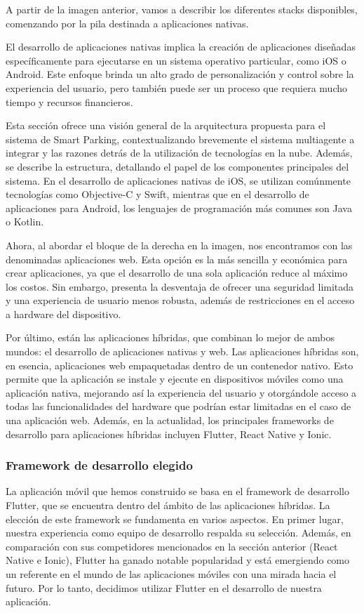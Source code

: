 A partir de la imagen anterior, vamos a describir los diferentes stacks disponibles, comenzando por la pila destinada a aplicaciones nativas.

El desarrollo de aplicaciones nativas implica la creación de aplicaciones diseñadas específicamente para ejecutarse en un sistema operativo particular, como iOS o Android. Este enfoque brinda un alto grado de personalización y control sobre la experiencia del usuario, pero también puede ser un proceso que requiera mucho tiempo y recursos financieros.

Esta sección ofrece una visión general de la arquitectura propuesta para el sistema de Smart Parking, contextualizando brevemente el sistema multiagente a integrar y las razones detrás de la utilización de tecnologías en la nube. Además, se describe la estructura, detallando el papel de los componentes principales del sistema. En el desarrollo de aplicaciones nativas de iOS, se utilizan comúnmente tecnologías como Objective-C y Swift, mientras que en el desarrollo de aplicaciones para Android, los lenguajes de programación más comunes son Java o Kotlin.

Ahora, al abordar el bloque de la derecha en la imagen, nos encontramos con las denominadas aplicaciones web. Esta opción es la más sencilla y económica para crear aplicaciones, ya que el desarrollo de una sola aplicación reduce al máximo los costos. Sin embargo, presenta la desventaja de ofrecer una seguridad limitada y una experiencia de usuario menos robusta, además de restricciones en el acceso a hardware del dispositivo.

Por último, están las aplicaciones híbridas, que combinan lo mejor de ambos mundos: el desarrollo de aplicaciones nativas y web. Las aplicaciones híbridas son, en esencia, aplicaciones web empaquetadas dentro de un contenedor nativo. Esto permite que la aplicación se instale y ejecute en dispositivos móviles como una aplicación nativa, mejorando así la experiencia del usuario y otorgándole acceso a todas las funcionalidades del hardware que podrían estar limitadas en el caso de una aplicación web. Además, en la actualidad, los principales frameworks de desarrollo para aplicaciones híbridas incluyen Flutter, React Native y Ionic.


\subsubsection{Framework de desarrollo elegido}
La aplicación móvil que hemos construido se basa en el framework de desarrollo Flutter, que se encuentra dentro del ámbito de las aplicaciones híbridas. La elección de este framework se fundamenta en varios aspectos. En primer lugar, nuestra experiencia como equipo de desarrollo respalda su selección. Además, en comparación con sus competidores mencionados en la sección anterior (React Native e Ionic), Flutter ha ganado notable popularidad y está emergiendo como un referente en el mundo de las aplicaciones móviles con una mirada hacia el futuro. Por lo tanto, decidimos utilizar Flutter en el desarrollo de nuestra aplicación.

